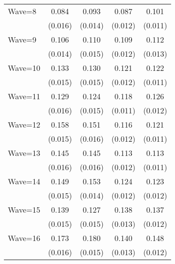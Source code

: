 {\begin{tabular}{l*{4}{c}}
Wave=8              &       0.084\sym{***}&       0.093\sym{***}&       0.087\sym{***}&       0.101\sym{***}\\
                    &     (0.016)         &     (0.014)         &     (0.012)         &     (0.011)         \\
Wave=9              &       0.106\sym{***}&       0.110\sym{***}&       0.109\sym{***}&       0.112\sym{***}\\
                    &     (0.014)         &     (0.015)         &     (0.012)         &     (0.013)         \\
Wave=10             &       0.133\sym{***}&       0.130\sym{***}&       0.121\sym{***}&       0.122\sym{***}\\
                    &     (0.015)         &     (0.015)         &     (0.012)         &     (0.011)         \\
Wave=11             &       0.129\sym{***}&       0.124\sym{***}&       0.118\sym{***}&       0.126\sym{***}\\
                    &     (0.016)         &     (0.015)         &     (0.011)         &     (0.012)         \\
Wave=12             &       0.158\sym{***}&       0.151\sym{***}&       0.116\sym{***}&       0.121\sym{***}\\
                    &     (0.015)         &     (0.016)         &     (0.012)         &     (0.011)         \\
Wave=13             &       0.145\sym{***}&       0.145\sym{***}&       0.113\sym{***}&       0.113\sym{***}\\
                    &     (0.016)         &     (0.016)         &     (0.012)         &     (0.011)         \\
Wave=14             &       0.149\sym{***}&       0.153\sym{***}&       0.124\sym{***}&       0.123\sym{***}\\
                    &     (0.015)         &     (0.014)         &     (0.012)         &     (0.012)         \\
Wave=15             &       0.139\sym{***}&       0.127\sym{***}&       0.138\sym{***}&       0.137\sym{***}\\
                    &     (0.015)         &     (0.015)         &     (0.013)         &     (0.012)         \\
Wave=16             &       0.173\sym{***}&       0.180\sym{***}&       0.140\sym{***}&       0.148\sym{***}\\
                    &     (0.016)         &     (0.015)         &     (0.013)         &     (0.012)         \\

\end{tabular}}
